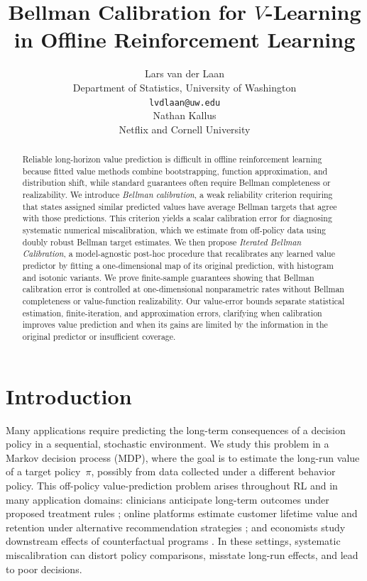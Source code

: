 \documentclass{article}
\title{Bellman Calibration for $V$-Learning in Offline Reinforcement Learning}
\author{%
  Lars van der Laan \\
  Department of Statistics, University of Washington \\
  \texttt{lvdlaan@uw.edu} \\
  \And
  Nathan Kallus \\
  Netflix and Cornell University
}
\theoremstyle{plain}
\theoremstyle{definition}
\theoremstyle{remark}
\begin{document}
\maketitle

\begin{abstract}
Reliable long-horizon value prediction is difficult in offline reinforcement
learning because fitted value methods combine bootstrapping, function
approximation, and distribution shift, while standard guarantees often require
Bellman completeness or realizability. We introduce \emph{Bellman calibration},
a weak reliability criterion requiring that states assigned similar predicted
values have average Bellman targets that agree with those predictions. This
criterion yields a scalar calibration error for diagnosing systematic numerical
miscalibration, which we estimate from off-policy data using doubly robust
Bellman target estimates. We then propose \emph{Iterated Bellman Calibration}, a
model-agnostic post-hoc procedure that recalibrates any learned value predictor
by fitting a one-dimensional map of its original prediction, with histogram and
isotonic variants. We prove finite-sample guarantees showing that Bellman
calibration error is controlled at one-dimensional nonparametric rates without
Bellman completeness or value-function realizability. Our value-error bounds
separate statistical estimation, finite-iteration, and approximation errors, clarifying when calibration improves value prediction and when
its gains are limited by the information in the original predictor or insufficient coverage.
\end{abstract}
\section{Introduction}

Many applications require predicting the long-term consequences of a decision
policy in a sequential, stochastic environment. We study this problem in a
Markov decision process (MDP), where the goal is to estimate the long-run value
of a target policy~\(\pi\), possibly from data collected under a different
behavior policy. This off-policy value-prediction problem arises throughout RL
and in many application domains: clinicians anticipate long-term outcomes under
proposed treatment rules \citep{van2019calibration}; online platforms estimate
customer lifetime value and retention under alternative recommendation
strategies \citep{theocharous2015ad,maystre2022temporally,xue2025auro}; and
economists study downstream effects of counterfactual programs
\citep{rust1987optimal,cowgill2019economics}. In these settings, systematic
miscalibration can distort policy comparisons, misstate long-run effects, and
lead to poor decisions.
\end{document}
